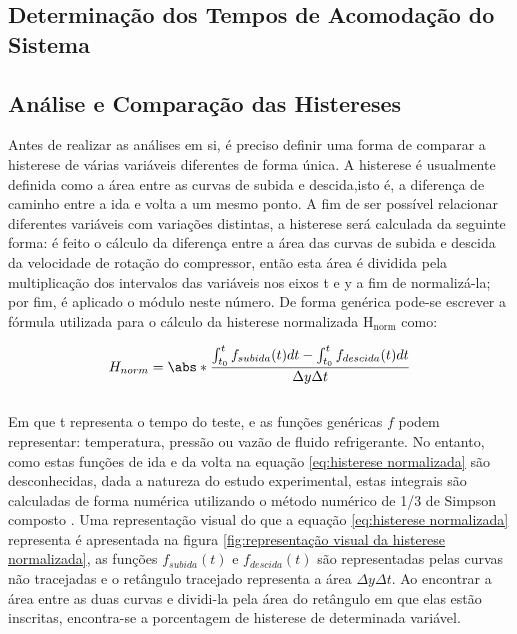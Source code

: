 \subsection{Determinação dos Tempos de Acomodação do Sistema}

\subsection{Análise e Comparação das Histereses} \label{subsec:Método de Análise da Histerese}

Antes de realizar as análises em si, é preciso definir uma forma de comparar a histerese de várias variáveis diferentes de forma única. A histerese é usualmente definida como a área entre as curvas de subida e descida,isto é, a diferença de caminho entre a ida e volta a um mesmo ponto. A fim de ser possível relacionar diferentes variáveis com variações distintas, a histerese será calculada da seguinte forma: é feito o cálculo da diferença entre a área das curvas de subida e descida da velocidade de rotação do compressor, então esta área é dividida pela multiplicação dos intervalos das variáveis nos eixos t e y a fim de normalizá-la; por fim, é aplicado o módulo neste número. De forma genérica pode-se escrever a fórmula utilizada para o cálculo da histerese normalizada $\text{H}_\text{norm}$ como:

\begin{equation}
    H_{norm} = \abs*{{\frac{\int_{t_0} ^t  f_{subida}(t) dt - \int_{t_0} ^t  f_{descida}(t) dt   }{\Delta y\Delta t }}}
    \label{eq:histerese normalizada}
\end{equation}
\\
Em que t representa o tempo do teste, e as funções genéricas $f$ podem representar: temperatura, pressão ou vazão de fluido refrigerante. No entanto, como estas funções de ida e da volta na equação \ref{eq:histerese normalizada} são desconhecidas, dada a natureza do estudo experimental, estas integrais são calculadas de forma numérica utilizando o método numérico de 1/3 de Simpson composto \cite{ChapraNumerico}. Uma representação visual do que a equação \ref{eq:histerese normalizada} representa é apresentada na figura \ref{fig:representação visual da histerese normalizada}, as funções $f_{subida}(t)$ e $f_{descida}(t)$ são representadas pelas curvas não tracejadas e o retângulo tracejado representa a área $\Delta y \Delta t$. Ao encontrar a área entre as duas curvas e dividi-la pela área do retângulo em que elas estão inscritas, encontra-se a porcentagem de histerese de determinada variável.

